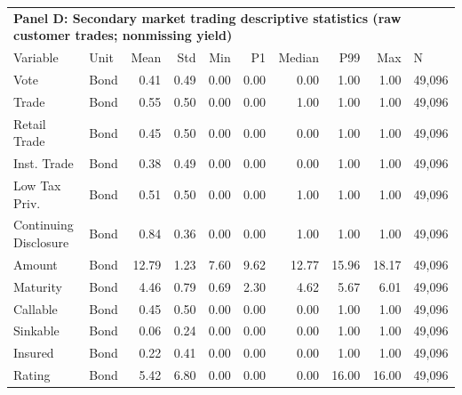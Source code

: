 \begin{table}[H]
\centering
\begin{tabular*}{\textwidth}{@{\extracolsep{\fill}}llrrrrrrrl}
\multicolumn{10}{l}{\textbf{Panel D: Secondary market trading descriptive statistics (raw customer trades; nonmissing yield)}}\\

\addlinespace
  \toprule
Variable & Unit & Mean & Std & Min & P1 & Median & P99 & Max & N \\ 
  \hline
Vote & Bond & 0.41 & 0.49 & 0.00 & 0.00 & 0.00 & 1.00 & 1.00 & 49,096 \\ 
  Trade & Bond & 0.55 & 0.50 & 0.00 & 0.00 & 1.00 & 1.00 & 1.00 & 49,096 \\ 
  Retail Trade & Bond & 0.45 & 0.50 & 0.00 & 0.00 & 0.00 & 1.00 & 1.00 & 49,096 \\ 
  Inst. Trade & Bond & 0.38 & 0.49 & 0.00 & 0.00 & 0.00 & 1.00 & 1.00 & 49,096 \\ 
  Low Tax Priv. & Bond & 0.51 & 0.50 & 0.00 & 0.00 & 1.00 & 1.00 & 1.00 & 49,096 \\ 
  Continuing Disclosure & Bond & 0.84 & 0.36 & 0.00 & 0.00 & 1.00 & 1.00 & 1.00 & 49,096 \\ 
  Amount & Bond & 12.79 & 1.23 & 7.60 & 9.62 & 12.77 & 15.96 & 18.17 & 49,096 \\ 
  Maturity & Bond & 4.46 & 0.79 & 0.69 & 2.30 & 4.62 & 5.67 & 6.01 & 49,096 \\ 
  Callable & Bond & 0.45 & 0.50 & 0.00 & 0.00 & 0.00 & 1.00 & 1.00 & 49,096 \\ 
  Sinkable & Bond & 0.06 & 0.24 & 0.00 & 0.00 & 0.00 & 1.00 & 1.00 & 49,096 \\ 
  Insured & Bond & 0.22 & 0.41 & 0.00 & 0.00 & 0.00 & 1.00 & 1.00 & 49,096 \\ 
  Rating & Bond & 5.42 & 6.80 & 0.00 & 0.00 & 0.00 & 16.00 & 16.00 & 49,096 \\ 
   \hline
\end{tabular*}
\end{table}
